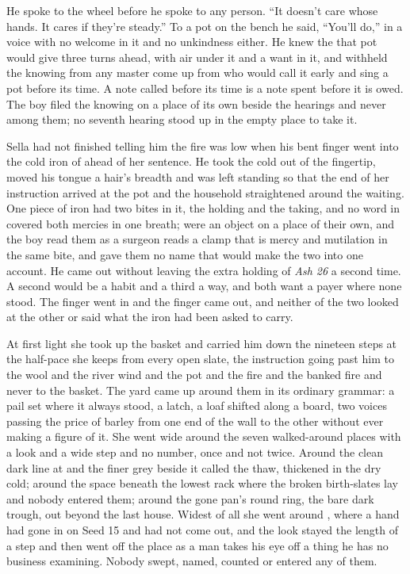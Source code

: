 He spoke to the wheel before he spoke to any person. “It doesn't care whose hands. It cares if they're steady.” To a pot on the bench he said, “You'll do,” in a voice with no welcome in it and no unkindness either. He knew the  that pot would give three turns ahead, with air under it and a want in it, and withheld the knowing from any master come up from  who would call it early and sing a pot before its time. A note called before its time is a note spent before it is owed. The boy filed the knowing on a place of its own beside the hearings and never among them; no seventh hearing stood up in the empty place to take it.

Sella had not finished telling him the fire was low when his bent finger went into the cold iron of  ahead of her sentence. He took the cold out of the fingertip, moved his tongue a hair's breadth and was left standing so that the end of her instruction arrived at the pot and the household straightened around the waiting. One piece of iron had two bites in it, the holding and the taking, and no word in  covered both mercies in one breath;  were an object on a place of their own, and the boy read them as a surgeon reads a clamp that is mercy and mutilation in the same bite, and gave them no name that would make the two into one account. He came out without leaving the extra holding of \emph{Ash 26} a second time. A second would be a habit and a third a way, and both want a payer where none stood. The finger went in and the finger came out, and neither of the two looked at the other or said what the iron had been asked to carry.

\scenebreak

At first light she took up the basket and carried him down the nineteen steps at the half-pace she keeps from every open slate, the instruction going past him to the wool and the river wind and the pot and the fire and the banked fire and never to the basket. The yard came up around them in its ordinary grammar: a pail set where it always stood, a latch, a loaf shifted along a board, two voices passing the price of barley from one end of the wall to the other without ever making a figure of it. She went wide around the seven walked-around places with a look and a wide step and no number, once and not twice. Around the clean dark line at  and the finer grey beside it called the thaw, thickened in the dry cold; around the space beneath the lowest rack where the broken birth-slates lay and nobody entered them; around the gone pan's round ring, the bare dark trough,  out beyond the last house. Widest of all she went around , where a hand had gone in on Seed 15 and had not come out, and the look stayed the length of a step and then went off the place as a man takes his eye off a thing he has no business examining. Nobody swept, named, counted or entered any of them.

